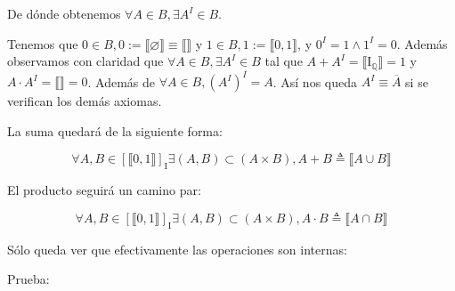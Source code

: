 De dónde obtenemos $\forall A \in B, \exists A^{I} \in B$.

Tenemos que $0 \in B, 0 := \llbracket \varnothing \rrbracket \equiv \llbracket \rrbracket$ y $1 \in B, 1 := \llbracket 0,1 \rrbracket$, y $0^{I} = 1 \land 1^{I} = 0$. Además observamos con claridad que $\forall A \in B, \exists A^{I} \in B$ tal que $A + A^{I} = \llbracket \mathbf{\mathrm{I}}_{\mathbb{Q}} \rrbracket = 1$ y $A \cdot A^{I} = \llbracket \rrbracket = 0$. Además de $\forall A \in B, (A^{I})^{I} = A$. Así nos queda $A^{I} \equiv \overline{A}$ si se verifican los demás axiomas.

La suma quedará de la siguiente forma:

\[ \forall A, B \in \left\lbrack \llbracket 0,1 \rrbracket \right\rbrack_{\mathbf{\mathrm{I}}} \exists (A,B) \subset (A \times B), A + B \triangleq \llbracket A \cup B \rrbracket \]

El producto seguirá un camino par:

\[ \forall A, B \in \left\lbrack \llbracket 0,1 \rrbracket \right\rbrack_{\mathbf{\mathrm{I}}} \exists (A,B) \subset (A \times B), A \cdot B \triangleq \llbracket A \cap B \rrbracket \]

Sólo queda ver que efectivamente las operaciones son internas:

Prueba:

